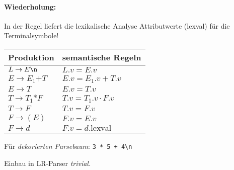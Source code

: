 \paragraph*{Wiederholung:}
In der Regel liefert die lexikalische Analyse Attributwerte (lexval) für die Terminalsymbole!
\begin{center}
    \begin{tabular}{l|l}
        Produktion             & semantische Regeln      \\\hline
        $L \to E\verb!\n!$     & $L.v = E.v$             \\\hline
        $E \to E_1 \texttt{+} T$&$E.v = E_1.v + T.v$     \\\hline
        $E \to T$              & $E.v = T.v$             \\\hline
        $T \to T_1 \texttt{*} F$&$T.v = T_1.v \cdot F.v$ \\\hline
        $T \to F$              & $T.v = F.v$             \\\hline
        $F \to (E)$            & $F.v = E.v$             \\\hline
        $F \to d$              & $F.v = d.\text{lexval}$
    \end{tabular}
\end{center}
\Bsp Für \emph{dekorierten Parsebaum}: \verb!3 * 5 + 4\n!
\begin{center}
\end{center}
Einbau in LR-Parser \emph{trivial.}

